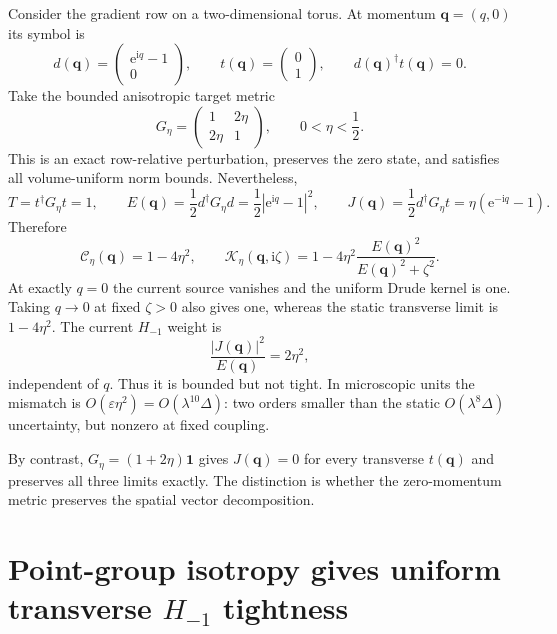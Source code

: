 \documentclass[11pt]{article}
\theoremstyle{definition}
\theoremstyle{remark}
\newcommand{\cK}{\mathcal K}
\newcommand{\cC}{\mathcal C}
\newcommand{\Id}{\mathbf 1}
\newcommand{\I}{\mathrm i}
\newcommand{\e}{\mathrm e}
\newcommand{\abs}[1]{\left\lvert #1\right\rvert}
\newcommand{\eps}{\varepsilon}
\newcommand{\bq}{\bm q}
\begin{document}
Consider the gradient row on a two-dimensional torus.  At momentum
$\bq=(q,0)$ its symbol is
\begin{equation}
 d(\bq)=\begin{pmatrix}\e^{\I q}-1\\0\end{pmatrix},
 \qquad
 t(\bq)=\begin{pmatrix}0\\1\end{pmatrix},
 \qquad d(\bq)^\dagger t(\bq)=0.
 \label{eq:edge-symbol}
\end{equation}
Take the bounded anisotropic target metric
\begin{equation}
 G_\eta=\begin{pmatrix}1&2\eta\\2\eta&1\end{pmatrix},
 \qquad 0<\eta<\frac12.
 \label{eq:anisotropic-G}
\end{equation}
This is an exact row-relative perturbation, preserves the zero state, and
satisfies all volume-uniform norm bounds.  Nevertheless,
\begin{equation}
 T=t^\dagger G_\eta t=1,
 \qquad
 E(\bq)=\frac12d^\dagger G_\eta d=\frac12\abs{\e^{\I q}-1}^2,
 \qquad
 J(\bq)=\frac12d^\dagger G_\eta t=\eta(\e^{-\I q}-1).
 \label{eq:aniso-data}
\end{equation}
Therefore
\begin{equation}
 \cC_\eta(\bq)=1-4\eta^2,
 \qquad
 \cK_\eta(\bq,\I\zeta)
 =1-4\eta^2\frac{E(\bq)^2}{E(\bq)^2+\zeta^2}.
 \label{eq:aniso-kernel}
\end{equation}
At exactly $q=0$ the current source vanishes and the uniform Drude kernel is
one.  Taking $q\to0$ at fixed $\zeta>0$ also gives one, whereas the static
transverse limit is $1-4\eta^2$.  The current $H_{-1}$ weight is
\begin{equation}
 \frac{\abs{J(\bq)}^2}{E(\bq)}=2\eta^2,
 \label{eq:aniso-hminusone}
\end{equation}
independent of $q$.  Thus it is bounded but not tight.  In microscopic units
the mismatch is $O(\eps\eta^2)=O(\lambda^{10}\Delta)$: two orders smaller
than the static $O(\lambda^8\Delta)$ uncertainty, but nonzero at fixed
coupling.

By contrast, $G_\eta=(1+2\eta)\Id$ gives $J(\bq)=0$ for every transverse
$t(\bq)$ and preserves all three limits exactly.  The distinction is whether
the zero-momentum metric preserves the spatial vector decomposition.

\section{Point-group isotropy gives uniform transverse $H_{-1}$ tightness}
\label{sec:isotropic-theorem}
\end{document}
